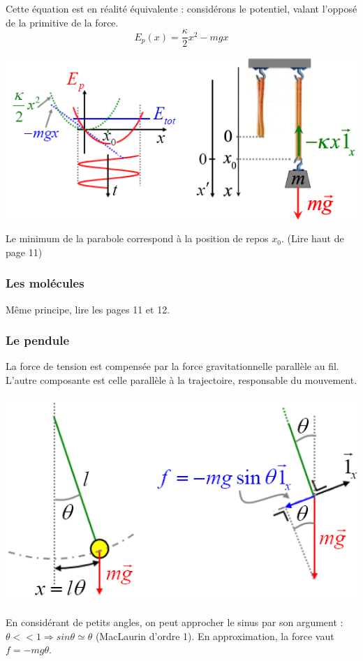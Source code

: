 \documentclass	[11pt, a4paper, openany]{book}
\begin{document}
Cette équation est en réalité équivalente : considérons le potentiel, valant l'opposé de la primitive de la force.
\begin{equation}
E_p(x) = \frac{\kappa}{2}x^2 - mgx
\end{equation}
\begin{center}
\includegraphics[scale=0.45]{oo/image4.png}
\end{center}
Le minimum de la parabole correspond à la position de repos $x_0$.  (Lire haut de page 11)

\subsubsection{Les molécules}
Même principe, lire les pages 11 et 12.

\subsubsection{Le pendule}
La force de tension est compensée par la force gravitationnelle parallèle au fil. L'autre composante  est celle parallèle à la trajectoire, responsable du mouvement.
\begin{center}
\includegraphics[scale=0.45]{oo/image5.png}
\end{center}
En considérant de petits angles, on peut approcher le sinus par son argument : $\theta << 1 \Rightarrow sin\theta \simeq \theta$ (MacLaurin d'ordre 1). En approximation, la force vaut $f = -mg\theta$.\\
\end{document}
